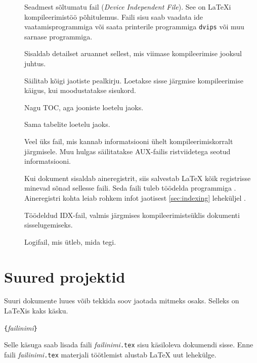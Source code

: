 {\begin{description}
\item[] Seadmest sõltumatu fail (\emph{Device Independent
File}). See on \LaTeX i kompileerimistöö põhitulemus. Faili sisu saab
vaadata ide vaatamisprogrammiga või saata printerile
programmiga \texttt{dvips} või muu sarnase
programmiga.
\item[] Sisaldab detailset aruannet sellest, mis viimase
kompileerimise jooksul juhtus.
\item[] Säilitab kõigi jaotiste pealkirju. Loetakse sisse
järgmise kompileerimise käigus, kui moodustatakse sisukord.
\item[] Nagu TOC, aga jooniste loetelu jaoks.
\item[] Sama tabelite loetelu jaoks.
\item[] Veel üks fail, mis kannab informatsiooni ühelt
kompileerimiskorralt järgmisele. Muu hulgas säilitatakse AUX-failis
ristviidetega seotud informatsiooni.
\item[] Kui dokument sisaldab aineregistrit, siis salvestab
\LaTeX{} kõik registrisse minevad sõnad sellesse faili. Seda faili
tuleb töödelda programmiga . Aineregistri kohta leiab
rohkem infot jaotisest \ref{sec:indexing} leheküljel
\pageref{sec:indexing}.
\item[] Töödeldud IDX-fail, valmis järgmises
kompileerimistsüklis dokumenti sisselugemiseks.
\item[] Logifail, mis ütleb, mida  tegi.
\end{description}


%
%



%

\section{Suured projektid}

Suuri dokumente luues võib tekkida soov jaotada  mitmeks
osaks. Selleks on \LaTeX is kaks käsku.
\begin{lscommand}
\verb|{|\emph{failinimi}\verb|}|
\end{lscommand}
\noindent Selle käsuga saab lisada faili \emph{failinimi}\verb|.tex|
sisu käsiloleva dokumendi sisse. Enne faili \emph{failinimi}\verb|.tex|
materjali töötlemist alustab \LaTeX{} uut lehekülge.

}
